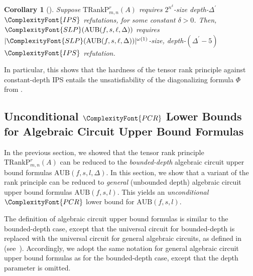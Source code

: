 \documentclass[11pt,letter]{article}
\newtheorem{corollary}[theorem]{Corollary}
\theoremstyle{remark} %
\newcommand{\TRankP}{\mathrm{TRankP}} %
\newcommand{\AUB}{\mathrm{AUB}} %
\newcommand{\IPS}{%
    {
        \ComplexityFont{IPS} 
    }
}
\newcommand{\SLP}{ %
    {
        \ComplexityFont{SLP}
    }
}
\newcommand{\PCR}{ %
    {
        \ComplexityFont{PCR}
    }
}
\begin{document}
{    \begin{corollary}[\cite{GGLST25}]
    \label{Cor:6.6}
        Suppose $\TRankP_{m,n}^r(A)$ requires $2^{n^\delta}$-size depth-$\Delta^\prime$ $\IPS$ refutations, for some constant $\delta>0$. Then, $\SLP(\AUB(f,s,\ell,\Delta))$ requires $|\SLP(\AUB(f,s,\ell,\Delta))|^{\omega(1)}$-size, depth-$(\Delta^\prime - 5)$ $\IPS$ refutation.
    \end{corollary}

    

    


    In particular, this shows that the hardness of the tensor rank principle against constant-depth IPS entails the unsatisfiability of the diagonalizing formula $\Phi$ from .


    \subsection{Unconditional $\PCR$ Lower Bounds for Algebraic Circuit Upper Bound Formulas}

    In the previous section, we showed that the tensor rank principle $\TRankP_{m,n}^r(A)$ can be reduced to the \emph{bounded-depth} algebraic circuit upper bound formulas $\AUB(f,s,l,\Delta)$. In this section, we show that a variant of the rank principle can be reduced to \emph{general} (unbounded depth) algebraic circuit upper bound formulas $\AUB(f,s,l)$. This yields an \emph{unconditional} $\PCR$ lower bound for $\AUB(f,s,l)$. 

    The definition of algebraic circuit upper bound formulas is similar to the bounded-depth case, except that the universal circuit for bounded-depth is replaced with the universal circuit for general algebraic circuits, as defined in~\cite{Raz10} (see~\cite{ST25}). Accordingly, we adopt the same notation for general algebraic circuit upper bound formulas as for the bounded-depth case, except that the depth parameter is omitted.

}
\end{document}
